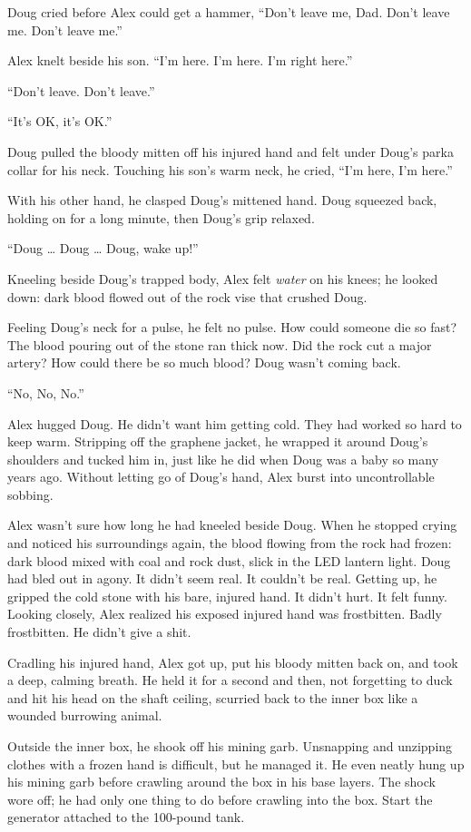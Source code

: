 Doug cried before Alex could get a hammer, ``Don't leave me, Dad. Don't
leave me. Don't leave me.''

Alex knelt beside his son. ``I'm here. I'm here. I'm right here.''

``Don't leave. Don't leave.''

``It's OK, it's OK.''

Doug pulled the bloody mitten off his injured hand and felt under Doug's
parka collar for his neck. Touching his son's warm neck, he cried, ``I'm
here, I'm here.''

With his other hand, he clasped Doug's mittened hand. Doug squeezed
back, holding on for a long minute, then Doug's grip relaxed.

``Doug \ldots{} Doug \ldots{} Doug, wake up!''

Kneeling beside Doug's trapped body, Alex felt \emph{water} on his
knees; he looked down: dark blood flowed out of the rock vise that
crushed Doug.

Feeling Doug's neck for a pulse, he felt no pulse. How could someone die
so fast? The blood pouring out of the stone ran thick now. Did the rock
cut a major artery? How could there be so much blood? Doug wasn't coming
back.

``No, No, No.''

Alex hugged Doug. He didn't want him getting cold. They had worked so
hard to keep warm. Stripping off the graphene jacket, he wrapped it
around Doug's shoulders and tucked him in, just like he did when Doug
was a baby so many years ago. Without letting go of Doug's hand, Alex
burst into uncontrollable sobbing.

Alex wasn't sure how long he had kneeled beside Doug. When he stopped
crying and noticed his surroundings again, the blood flowing from the
rock had frozen: dark blood mixed with coal and rock dust, slick in the
LED lantern light. Doug had bled out in agony. It didn't seem real. It
couldn't be real. Getting up, he gripped the cold stone with his bare,
injured hand. It didn't hurt. It felt funny. Looking closely, Alex
realized his exposed injured hand was frostbitten. Badly frostbitten. He
didn't give a shit.

Cradling his injured hand, Alex got up, put his bloody mitten back on,
and took a deep, calming breath. He held it for a second and then, not
forgetting to duck and hit his head on the shaft ceiling, scurried back
to the inner box like a wounded burrowing animal.

Outside the inner box, he shook off his mining garb. Unsnapping and
unzipping clothes with a frozen hand is difficult, but he managed it. He
even neatly hung up his mining garb before crawling around the box in
his base layers. The shock wore off; he had only one thing to do before
crawling into the box. Start the generator attached to the 100-pound
tank.

